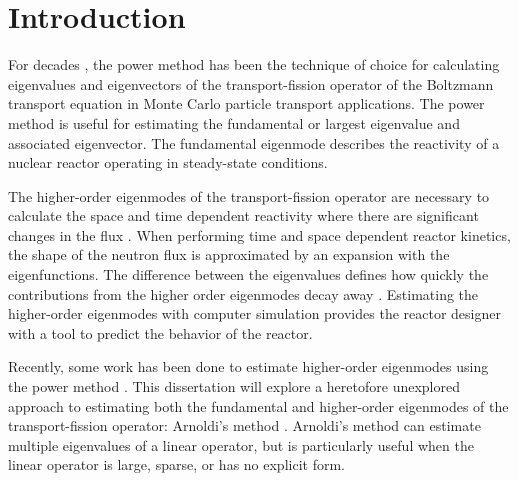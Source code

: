 
\chapter{Introduction \label{ch:Introduction}}

For decades \citep[see][]{Kaplan:1958Monte-0,Goad:1959A-Mon-0,Lieberoth:1968A-Mon-0,Mendelson:1968Monte-0}, the power method has been the technique of choice for calculating eigenvalues and eigenvectors of the transport-fission operator of the Boltzmann transport equation in Monte Carlo particle transport applications.  The power method is useful for estimating the fundamental or largest eigenvalue and associated eigenvector.  The fundamental eigenmode describes the reactivity of a nuclear reactor operating in steady-state conditions.

The higher-order eigenmodes of the transport-fission operator are necessary to calculate the space and time dependent reactivity where there are significant changes in the flux \cite{Vashaee:2008Refer-0}.  When performing time and space dependent reactor kinetics, the shape of the neutron flux is approximated by an expansion with the eigenfunctions.  The difference between the eigenvalues defines how quickly the contributions from the higher order eigenmodes decay away \cite{Akcasu:5-0}.  Estimating the higher-order eigenmodes with computer simulation provides the reactor designer with a tool to predict the behavior of the reactor.

Recently, some work has been done to estimate higher-order eigenmodes using the power method \citep{Booth:2003Compu-0}.  This dissertation will explore a heretofore unexplored approach to estimating both the fundamental and higher-order eigenmodes of the transport-fission operator: Arnoldi's method \cite{Arnoldi:1951The-P-0}.  Arnoldi's method can estimate multiple eigenvalues of a linear operator, but is particularly useful when the linear operator is large, sparse, or has no explicit form.

